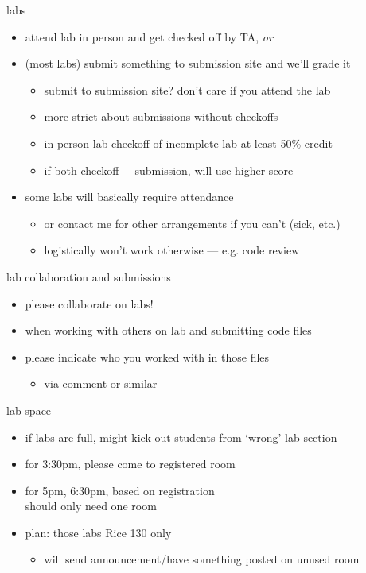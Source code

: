 \begin{frame}{labs}
    \begin{itemize}
    \item attend lab in person and get checked off by TA, \textit{or}
    \item (most labs) submit something to submission site and we'll grade it
        \begin{itemize}
        \item submit to submission site? don't care if you attend the lab
        \item more strict about submissions without checkoffs
        \item in-person lab checkoff of incomplete lab at least 50\% credit
        \item if both checkoff + submission, will use higher score
        \end{itemize}
    \item some labs will basically require attendance
        \begin{itemize}
        \item or contact me for other arrangements if you can't (sick, etc.)
        \item logistically won't work otherwise --- e.g. code review
        \end{itemize}
    \end{itemize}
\end{frame}

\begin{frame}{lab collaboration and submissions}
    \begin{itemize}
    \item please collaborate on labs!
    \vspace{.5cm}
    \item when working with others on lab and submitting code files
    \item please indicate who you worked with in those files
        \begin{itemize}
        \item via comment or similar
        \end{itemize}
    \end{itemize}
\end{frame}

\begin{frame}{lab space}
    \begin{itemize}
    \item if labs are full, might kick out students from `wrong' lab section
    \vspace{.5cm}
    \item for 3:30pm, please come to registered room
    \item for 5pm, 6:30pm, based on registration \\
        should only need one room
    \item plan: those labs Rice 130 only
        \begin{itemize}
        \item will send announcement/have something posted on unused room
        \end{itemize}
    \end{itemize}
\end{frame}
